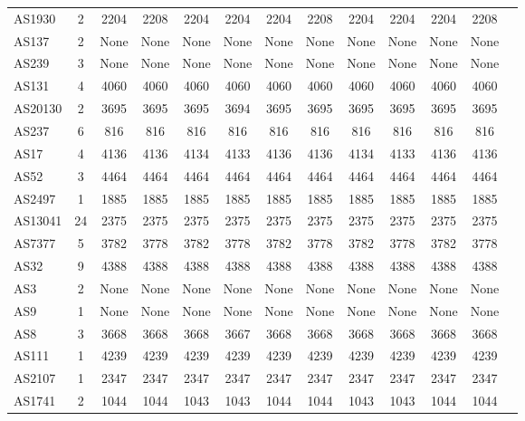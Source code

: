 \documentclass[10pt,journal,compsoc]{IEEEtran}
\begin{document}
\begin{table}[ht]
{\begin{tabular}{lc|cc||cc||cc||cc||cc||c}
AS1930&2 & \cellcolor{red!40}2204 & \cellcolor{red!40}2208  &2204  & 2204 &  \cellcolor{red!40}2204 &  \cellcolor{red!40}2208 & 2204 & 2204 &\cellcolor{green!40}2204  &\cellcolor{green!40} 2208\\
AS137&2 &None  &None & None  & None & None & None & None & None &None  &None \\
AS239&3 & None &None  &  None&None  & None & None & None & None &  None&None \\
AS131&4  &4060 &4060  & 4060 & 4060 & 4060 & 4060 & 4060 & 4060 & 4060 &4060 \\
AS20130& 2& 3695 &3695 &\cellcolor{blue!40} 3695 &\cellcolor{blue!40} 3694 & 3695 & 3695 & 3695 & 3695 &  3695&3695 \\
AS237&6  &816 & 816& 816  &816  & 816 & 816 & 816 & 816 & 816 & 816\\
AS17&4   &4136&4136 & \cellcolor{blue!40}  4134&  \cellcolor{blue!40} 4133& 4136 & 4136 & \cellcolor{blue!40}4134 & \cellcolor{blue!40}4133 & 4136 &4136 \\
AS52&3   &4464&4464 & 4464  &4464  & 4464 & 4464 & 4464 & 4464 & 4464 &4464 \\
AS2497&1  &1885&1885  & 1885 & 1885 & 1885 & 1885 & 1885 & 1885 & 1885 & 1885\\
AS13041&24  &2375& 2375 & 2375 &2375  & 2375 & 2375 & 2375 & 2375 &2375  &2375 \\
AS7377&5 &\cellcolor{red!40}3782  &\cellcolor{red!40}3778  &\cellcolor{blue!40}3782  &\cellcolor{blue!40}3778  & \cellcolor{red!40}3782 & \cellcolor{red!40}3778 & \cellcolor{red!40}3782 & \cellcolor{red!40}3778 &\cellcolor{green!40}3782 & \cellcolor{green!40}3778 \\
AS32& 9 &4388 &4388 & 4388 & 4388  & 4388 & 4388 & 4388 & 4388 &  4388&4388 \\
AS3& 2 &None &None   & None & None & None & None & None & None & None & None\\
AS9& 1 &None & None  &None  & None & None & None & None & None &  None&None \\
AS8&3 & 3668 &3668  &\cellcolor{blue!40}3668  &\cellcolor{blue!40}3667  & 3668 & 3668 & 3668 & 3668 &  3668&3668 \\
AS111& 1& 4239 &4239   & 4239 & 4239 & 4239 & 4239 & 4239 & 4239 & 4239 &4239 \\
AS2107& 1&2347  &2347  &  2347&2347  & 2347 & 2347 & 2347 & 2347 &  2347&2347 \\
AS1741&2 &1044  & 1044& 1043  &  1043& 1044 & 1044 & 1043 & 1043 &1044  &1044 \\

\end{tabular}}
\end{table}
\end{document}
